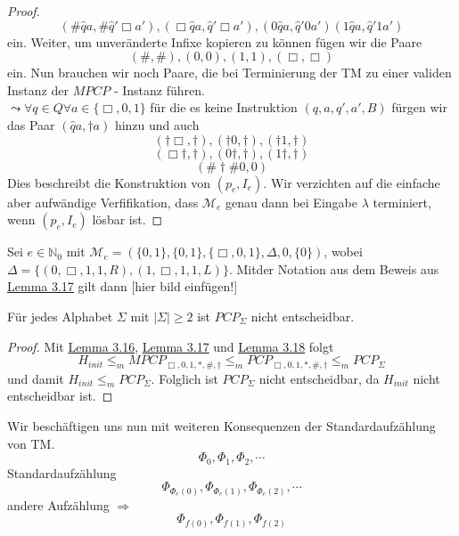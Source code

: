 \begin{proof}
      \[
        (\# \hat{q}a, \# \hat{q}'\Box a'), (\Box \hat{q} a, \hat{q}'\Box a'), (0\hat{q}a, \hat{q}'0a')(1\hat{q}a, \hat{q}'1a')
      \]
      ein. Weiter, um unveränderte Infixe kopieren zu können fügen wir die Paare 
      \[
        (\#, \#), (0, 0), (1,1), (\Box, \Box)
      \]
      ein. Nun brauchen wir noch Paare, die bei Terminierung der TM zu einer validen Instanz der \(MPCP\) - Instanz führen.\\ \(\leadsto \forall q \in Q \forall a \in \{\Box, 0, 1\}\) für die es keine Instruktion \((q, a, q', a', B)\) fürgen wir das Paar \((\hat{q}a, \dagger a)\) hinzu und auch 
      \[
        (\dagger \Box, \dagger), (\dagger 0, \dagger), (\dagger 1, \dagger)
      \] 
      \[
        (\Box \dagger, \dagger),(0 \dagger, \dagger),(1\dagger, \dagger)
      \] 
      \[
        (\# \dagger \# 0, 0)
      \]
      Dies beschreibt die Konstruktion von \((p_e, I_e)\). Wir verzichten auf die einfache aber aufwändige Verfifikation, dass \(\mathcal{M}_e\) genau dann bei Eingabe \(\lambda\) terminiert, wenn \((p_e, I_e)\) lösbar ist.
    \end{proof}

    Sei \(e \in \mathbb{N}_0\) mit \(\mathcal{M}_e = (\{0, 1\}, \{0, 1\}, \{\Box, 0, 1\}, \Delta, 0, \{0\})\), wobei \(\Delta = \{(0, \Box, 1, 1, R), (1, \Box, 1, 1, L)\}\). Mitder Notation aus dem Beweis aus \hyperref[subsec:3.16]{Lemma 3.17} gilt dann [hier bild einfügen!]

    Für jedes Alphabet \(\Sigma\) mit \(|\Sigma| \geq 2\) ist \(PCP_{\Sigma}\) nicht entscheidbar. 
    \begin{proof}
      Mit \hyperref[subsec:3.16]{Lemma 3.16}, \hyperref[subsec:3.17]{Lemma 3.17} und \hyperref[subsec:3.18]{Lemma 3.18} folgt 
      \[
        H_{init} \leq_m MPCP_{\Box, 0, 1, *, \#, \dagger} \leq_m PCP_{\Box, 0, 1, *, \#, \dagger} \leq_m PCP_{\Sigma}
      \] 
      und damit \(H_{init} \leq_m PCP_{\Sigma}\). Folglich ist \(PCP_{\Sigma}\) nicht entscheidbar, da \(H_{init}\) nicht entscheidbar ist.
    \end{proof}

    Wir beschäftigen uns nun mit weiteren Konsequenzen der Standardaufzählung von TM. 
    \[
      \Phi_0, \Phi_1, \Phi_2, \cdots
    \]
    Standardaufzählung 
    \[
      \Phi_{\Phi_e(0)}, \Phi_{\Phi_e(1)}, \Phi_{\Phi_e(2)}, \cdots
    \]
    andere Aufzählung \(\Rightarrow\) 
    \[
      \Phi_{f(0)}, \Phi_{f(1)}, \Phi_{f(2)}
    \]

